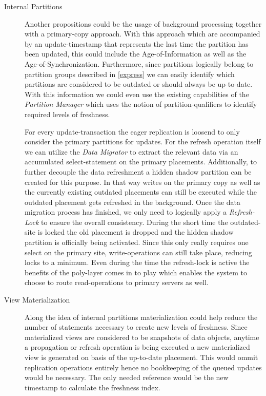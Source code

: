 \begin{description}





    \item [Internal Partitions]
    Another propositions could be the usage of background processing together with a primary-copy approach. With this approach
    which are accompanied by an update-timestamp that represents the last time the partition has been updated, this could include the Age-of-Information as well as 
    the Age-of-Synchronization. Furthermore, since partitions logically belong to partition groups described in \ref{express} we can easily identify which partitions are considered to be 
    outdated or should always be up-to-date. With this information we could even use the existing capabilities of the \emph{Partition Manager} which uses the notion of 
    partition-qualifiers to identify required levels of freshness.

    For every update-transaction the eager replication is loosend to only consider the primary partitions for updates.
    For the refresh operation itself we can utilize the \emph{Data Migrator} to extract the relevant data via an accumulated select-statement on the primary placements.
    Additionally, to further decouple the data refreshment a hidden shadow partition can be created for this purpose. In that way writes on the primary copy as well as the 
    currently existing outdated placements can still be executed while the outdated placement gets refreshed in the background. Once the data migration process has finished, 
    we only need to logically apply a \emph{Refresh-Lock} to ensure the overall consistency. During the short time the outdated-site is locked the old placement is dropped and 
    the hidden shadow partition is officially being activated. Since this only really requires one select on the primary site, write-operations can still take place, reducing
    locks to a minimum. Even during the time the refresh-lock is active the benefits of the poly-layer comes in to play which enables the system to choose to 
    route read-operations to primary servers as well.\\


\item [View Materialization]
Along the idea of internal partitions materialization could help reduce the number of statements necessary to create new levels of freshness.
Since materialized views are considered to be snapshots of data objects, anytime a propagation or refresh operation is being executed a new materialized view is 
generated on basis of the up-to-date placement.
This would ommit replication operations entirely hence no bookkeeping of the queued updates would be necessary. The only needed reference would be the new timestamp
to calculate the freshness index.


\end{description}

